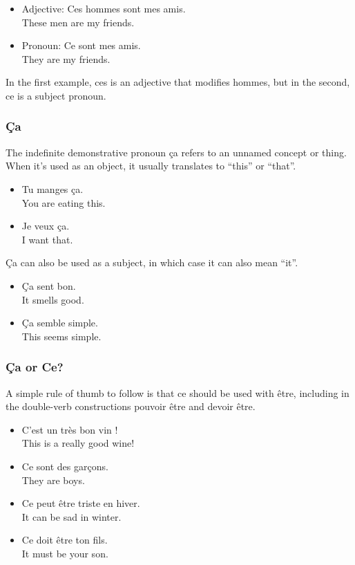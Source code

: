 \begin{itemize}
  \item  Adjective: Ces hommes sont mes amis. \\ These men are my friends.
  \item  Pronoun: Ce sont mes amis. \\ They are my friends. 
\end{itemize}

In the first example, ces is an adjective that modifies hommes, but in the second, ce is a subject pronoun.

\subsubsection{{\c C}a}

The indefinite demonstrative pronoun {\c c}a refers to an unnamed concept or thing. When it's used as an object, it usually translates to ``this'' or ``that''.

\begin{itemize}
  \item  Tu manges {\c c}a. \\ You are eating this.
  \item  Je veux {\c c}a. \\ I want that.
\end{itemize}

{\c C}a can also be used as a subject, in which case it can also mean ``it''.

\begin{itemize}
  \item  {\c C}a sent bon. \\ It smells good.
  \item  {\c C}a semble simple. \\ This seems simple.
\end{itemize}

\subsubsection{{\c C}a or Ce?}

A simple rule of thumb to follow is that ce should be used with {\^e}tre, including in the double-verb constructions pouvoir {\^e}tre and devoir {\^e}tre.

\begin{itemize}
  \item  C’est un très bon vin ! \\ This is a really good wine!
  \item  Ce sont des garçons. \\ They are boys.
  \item  Ce peut être triste en hiver. \\ It can be sad in winter.
  \item  Ce doit être ton fils. \\ It must be your son.
\end{itemize}

